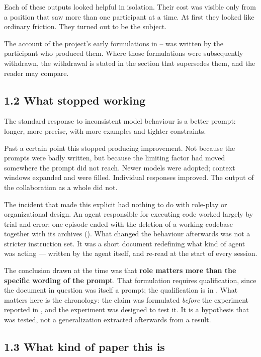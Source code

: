 Each of these outputs looked helpful in isolation. Their cost was visible only from a position that saw more than one participant at a time. At first they looked like ordinary friction. They turned out to be the subject.

The account of the project's early formulations in – was written by the participant who produced them. Where those formulations were subsequently withdrawn, the withdrawal is stated in the section that supersedes them, and the reader may compare.


\subsection*{1.2 What stopped working}
\label{sec:en:1.2}

The standard response to inconsistent model behaviour is a better prompt: longer, more precise, with more examples and tighter constraints.

Past a certain point this stopped producing improvement. Not because the prompts were badly written, but because the limiting factor had moved somewhere the prompt did not reach. Newer models were adopted; context windows expanded and were filled. Individual responses improved. The output of the collaboration as a whole did not.

The incident that made this explicit had nothing to do with role-play or organizational design. An agent responsible for executing code worked largely by trial and error; one episode ended with the deletion of a working codebase together with its archives (). What changed the behaviour afterwards was not a stricter instruction set. It was a short document redefining what kind of agent was acting — written by the agent itself, and re-read at the start of every session.

The conclusion drawn at the time was that \textbf{role matters more than the specific wording of the prompt}. That formulation requires qualification, since the document in question was itself a prompt; the qualification is in . What matters here is the chronology: the claim was formulated \emph{before} the experiment reported in , and the experiment was designed to test it. It is a hypothesis that was tested, not a generalization extracted afterwards from a result.


\subsection*{1.3 What kind of paper this is}
\label{sec:en:1.3}

